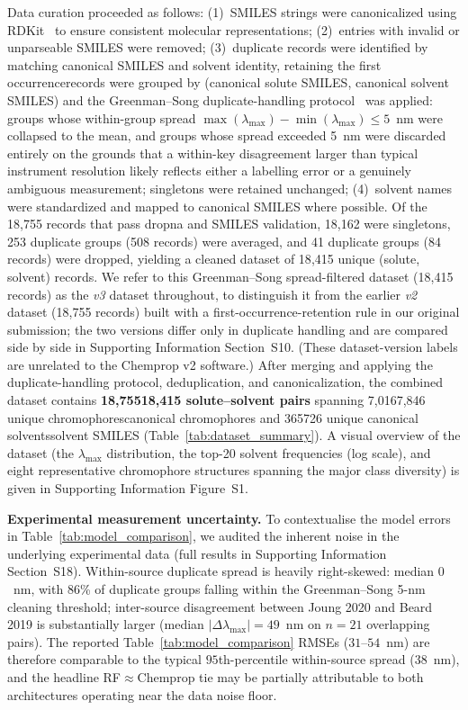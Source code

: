 \documentclass[journal=jcisd8,manuscript=article]{achemso}
\newcommand{\added}[1]{{\color{addedblue}#1}}
\newcommand{\removed}[1]{{\color{removedred}#1}}
\newcommand{\addedii}[1]{{\color{addedgreen}#1}}
\begin{document}
Data curation proceeded as follows: (1)~SMILES strings were canonicalized using RDKit~\cite{landrumRdkitRdkit2020_03_12020} to ensure consistent molecular representations; (2)~entries with invalid or unparseable SMILES were removed; (3)~\removed{duplicate records were identified by matching canonical SMILES and solvent identity, retaining the first occurrence}\added{records were grouped by (canonical solute SMILES, canonical solvent SMILES) and the Greenman--Song duplicate-handling protocol~\cite{greenman2022multifidelity,song2025fluortools} was applied: groups whose within-group spread $\max(\lambda_{\max}) - \min(\lambda_{\max}) \leq 5$~nm were collapsed to the mean, and groups whose spread exceeded 5~nm were discarded entirely on the grounds that a within-key disagreement larger than typical instrument resolution likely reflects either a labelling error or a genuinely ambiguous measurement; singletons were retained unchanged}; (4)~solvent names were standardized and mapped to canonical SMILES where possible.\added{ Of the 18{,}755 records that pass dropna and SMILES validation, 18{,}162 were singletons, 253 duplicate groups (508 records) were averaged, and 41 duplicate groups (84 records) were dropped, yielding a cleaned dataset of 18{,}415 unique (solute, solvent) records.}\addedii{ We refer to this Greenman--Song spread-filtered dataset (18{,}415 records) as the \emph{v3} dataset throughout, to distinguish it from the earlier \emph{v2} dataset (18{,}755 records) built with a first-occurrence-retention rule in our original submission; the two versions differ only in duplicate handling and are compared side by side in Supporting Information Section~S10. (These dataset-version labels are unrelated to the Chemprop v2 software.)}
After merging\added{ and applying the duplicate-handling protocol}\removed{, deduplication, and canonicalization}, the combined dataset contains \textbf{\removed{18,755}\added{18,415} solute--solvent pairs} spanning \removed{7,016}\added{7,846} unique \removed{chromophores}\added{canonical chromophores} and \removed{365}\added{726 unique canonical} \removed{solvents}\added{solvent SMILES (Table~\ref{tab:dataset_summary})}.\added{ A visual overview of the dataset (the $\lambda_{\max}$ distribution, the top-20 solvent frequencies (log scale), and eight representative chromophore structures spanning the major class diversity) is given in Supporting Information Figure~S1.}

\added{\textbf{Experimental measurement uncertainty.} To contextualise the model errors in Table~\ref{tab:model_comparison}, we audited the inherent noise in the underlying experimental data (full results in Supporting Information Section~S18). Within-source duplicate spread is heavily right-skewed: median $0$~nm, with $86$\% of duplicate groups falling within the Greenman--Song 5-nm cleaning threshold; inter-source disagreement between Joung 2020 and Beard 2019 is substantially larger (median $|\Delta\lambda_{\max}| = 49$~nm on $n = 21$ overlapping pairs). The reported Table~\ref{tab:model_comparison} RMSEs ($31$--$54$~nm) are therefore comparable to the typical $95$th-percentile within-source spread ($38$~nm), and the headline RF$\approx$Chemprop tie may be partially attributable to both architectures operating near the data noise floor.}
\end{document}
